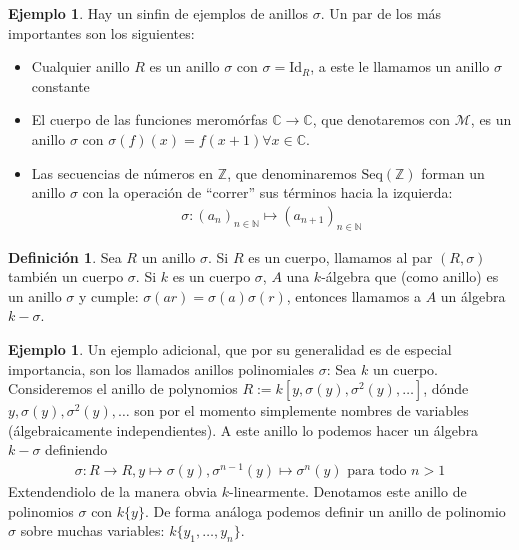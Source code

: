\documentclass[12pt,a4paper,BCOR15mm,twoside,DIV12]{article}
\def\N{\mathbb{N}}
\def\Z{\mathbb{Z}}
\def\C{\mathbb{C}}
\def\fa{\text{ para todo }}
\def\Id{\text{Id}}
\theoremstyle{definition}
\newtheorem{ex}[Satz]{Ejemplo}
\newtheorem{defn}[Satz]{Definición}
\begin{document}
\begin{ex} Hay un sinfin de ejemplos de anillos $\sigma$. Un par de los más importantes son los siguientes:

\begin{itemize}
\item Cualquier anillo $R$ es un anillo $\sigma$ con $\sigma = \Id_R$, a este le llamamos un anillo $\sigma$ constante
\item El cuerpo de las funciones meromórfas $\C \rightarrow \C$, que denotaremos con $\mathcal{M}$,
 es un anillo $\sigma$ con $\sigma(f)(x) = f(x+1) \forall x \in \C$.
\item Las secuencias de números en $\Z$, que denominaremos $\text{Seq}(\Z)$ forman un anillo $\sigma$ con la operación de ``correr'' sus términos hacia la izquierda:
\begin{align*} \sigma: (a_n)_{n \in \N} \mapsto (a_{n+1})_{n \in \N} \end{align*}
\end{itemize}
\end{ex}

\begin{defn}
Sea $R$ un anillo $\sigma$. Si $R$ es un cuerpo, llamamos al par $(R,\sigma)$ también un cuerpo $\sigma$. 
Si $k$ es un cuerpo $\sigma$, $A$ una $k$-álgebra que (como anillo) es un anillo $\sigma$ y cumple:
$\sigma(ar) = \sigma(a) \sigma(r)$, entonces llamamos a $A$ un álgebra $k-\sigma$.
\end{defn}

\begin{ex}
Un ejemplo adicional, que por su generalidad es de especial importancia, son los llamados anillos polinomiales $\sigma$:
Sea $k$ un cuerpo. Consideremos el anillo de polynomios $R:= k[y,\sigma(y),\sigma^2(y),\ldots]$,
 dónde $y,\sigma(y),\sigma^2(y),\ldots$ son por el momento simplemente nombres de variables (álgebraicamente independientes).
A este anillo lo podemos hacer un álgebra $k-\sigma$ definiendo 
\begin{align*} 
\sigma:  R \rightarrow R, y \mapsto \sigma(y), \sigma^{n-1}(y) \mapsto \sigma^{n}(y) \fa n > 1 
\end{align*}
Extendendiolo de la manera obvia $k$-linearmente. Denotamos este anillo de polinomios $\sigma$ con $k\{y\}$. De forma análoga podemos definir un anillo de polinomio $\sigma$ sobre muchas variables:
$k\{y_1, \ldots, y_n \}$.
\end{ex}
\end{document}
